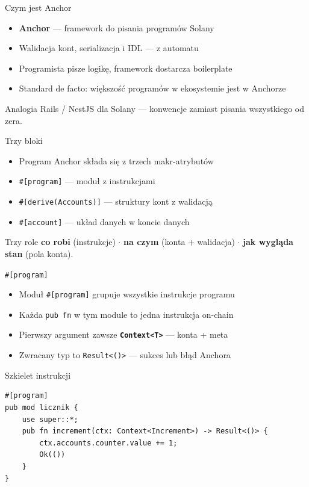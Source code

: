 \begin{frame}{Czym jest Anchor}
  \begin{itemize}
    \item \textbf{Anchor} --- framework do pisania programów Solany
    \item Walidacja kont, serializacja i IDL --- z automatu
    \item Programista pisze logikę, framework dostarcza boilerplate
    \item Standard de facto: większość programów w ekosystemie jest w Anchorze
  \end{itemize}
  \vspace{0.25cm}
  \begin{exampleblock}{Analogia}
    Rails / NestJS dla Solany --- konwencje zamiast pisania wszystkiego od zera.
  \end{exampleblock}
\end{frame}

\begin{frame}{Trzy bloki}
  \begin{itemize}
    \item Program Anchor składa się z trzech makr-atrybutów
    \item \texttt{\#[program]} --- moduł z instrukcjami
    \item \texttt{\#[derive(Accounts)]} --- struktury kont z walidacją
    \item \texttt{\#[account]} --- układ danych w koncie danych
  \end{itemize}
  \vspace{0.25cm}
  \begin{block}{Trzy role}
    \textbf{co robi} (instrukcje) $\cdot$ \textbf{na czym} (konta + walidacja) $\cdot$
    \textbf{jak wygląda stan} (pola konta).
  \end{block}
\end{frame}

\begin{frame}[fragile]{\texttt{\#[program]}}
  \begin{itemize}
    \item Moduł \texttt{\#[program]} grupuje wszystkie instrukcje programu
    \item Każda \texttt{pub fn} w tym module to jedna instrukcja on-chain
    \item Pierwszy argument zawsze \texttt{\textbf{Context<T>}} --- konta + meta
    \item Zwracany typ to \texttt{Result<()>} --- sukces lub błąd Anchora
  \end{itemize}
  \begin{block}{Szkielet instrukcji}
\begin{lstlisting}
#[program]
pub mod licznik {
    use super::*;
    pub fn increment(ctx: Context<Increment>) -> Result<()> {
        ctx.accounts.counter.value += 1;
        Ok(())
    }
}
\end{lstlisting}
  \end{block}
\end{frame}

